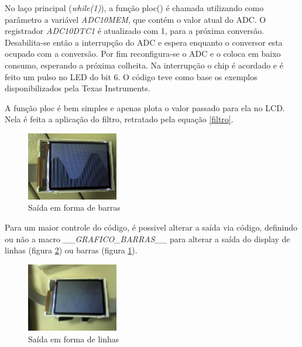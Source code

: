 %

%
No laço principal (\textit{while(1)}), a função ploc() é chamada utilizando como parâmetro a variável \textit{ADC10MEM}, que contém o valor atual do ADC. O registrador \textit{ADC10DTC1} é atualizado com 1, para a próxima conversão. Desabilita-se então a interrupção do ADC e espera enquanto o conversor esta ocupado com a conversão. Por fim reconfigura-se o ADC e o coloca em baixo consumo, esperando a próxima colheita. Na interrupção o chip é acordado e é feito um pulso no LED do bit 6. O código teve como  base os exemplos disponibilizados pela Texas Instruments\cite{ti_exemplos}.



A função ploc é bem simples e apenas plota o valor passado para ela no LCD. Nela é feita a aplicação do filtro, retratado pela equação \ref{filtro}. 

\begin{figure} %
  \centering
  \includegraphics[width=4cm,angle=0]{./fts/snap2}
  \caption{Saída em forma de barras}
  \label{barras}
\end{figure}

Para um maior controle do código, é possivel alterar a saída via código, definindo ou não a macro \textit{\_\_GRAFICO\_BARRAS\_\_} para alterar a saída do display de linhas (figura \ref{linhas}) ou barras (figura \ref{barras}).

\begin{figure} %
  \centering
  \includegraphics[width=4cm,angle=0]{./fts/snap0}
  \caption{Saída em forma de linhas}
  \label{linhas}
\end{figure}

%
